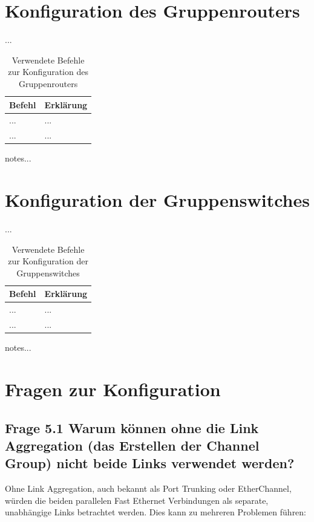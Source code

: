 \documentclass{article}
\begin{document}
\pagebreak



\section{Konfiguration des Gruppenrouters}

...\\

\begin{table}[htbp]
    \centering
    \begin{tabularx}{\textwidth}{|X|X|}
        \toprule
        \textbf{Befehl} & \textbf{Erklärung} \\
        \midrule
        ... & ...\\
        \hline
        ... & ...\\
        \bottomrule
    \end{tabularx}
    \caption{Verwendete Befehle zur Konfiguration des Gruppenrouters}
\end{table}

\noindent notes...



\section{Konfiguration der Gruppenswitches}

...\\

\begin{table}[htbp]
    \centering
    \begin{tabularx}{\textwidth}{|X|X|}
        \toprule
        \textbf{Befehl} & \textbf{Erklärung} \\
        \midrule
        ... & ...\\
        \hline
        ... & ...\\
        \bottomrule
    \end{tabularx}
    \caption{Verwendete Befehle zur Konfiguration der Gruppenswitches}
    \label{tab:commands}
\end{table}
\noindent notes...

\section{Fragen zur Konfiguration}

\subsection*{Frage 5.1 \normalfont Warum können ohne die Link Aggregation (das Erstellen der Channel Group) nicht beide Links verwendet werden?}
Ohne Link Aggregation, auch bekannt als Port Trunking oder EtherChannel, würden die beiden parallelen Fast Ethernet Verbindungen als separate, unabhängige Links betrachtet werden. Dies kann zu mehreren Problemen führen:
\end{document}
